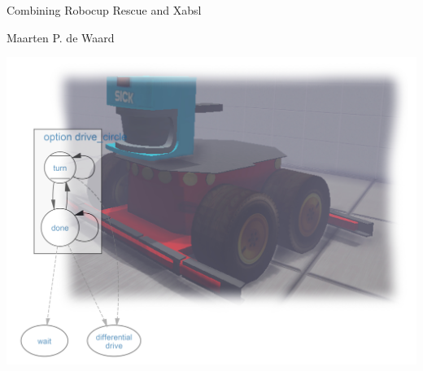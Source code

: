 \onecolumn
\thispagestyle{empty}
\vspace*{2cm}
\begin{center}
\begin{Huge} 
Combining Robocup Rescue and Xabsl\\
\end{Huge}
\vspace{.5cm}
\begin{Large}
Maarten P. de Waard\\
\end{Large}
\vspace{3cm}
\includegraphics[width=\textwidth]{title_page/titlePageImage.jpg}
\end{center}



